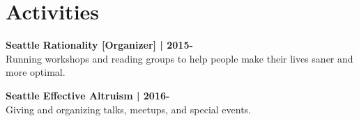 \section{Activities}

\textbf{Seattle Rationality [Organizer] | 2015-}\\
Running workshops and reading groups to help people make their lives saner and more optimal.
\sectionsep

\textbf{Seattle Effective Altruism | 2016-}\\
Giving and organizing talks, meetups, and special events.
\sectionsep
